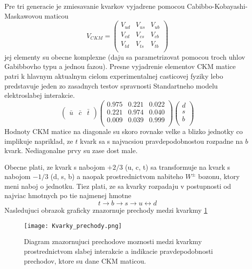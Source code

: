 \documentclass[../../main.tex]{subfiles}
\begin{document}
Pre tri generacie je zmiesavanie kvarkov vyjadrene pomocou Cabibbo-Kobayashi-Maskawovou maticou
\[ V_{CKM}=
\begin{pmatrix}
    V_{ud} & V_{us} & V_{ub} \\
    V_{cd} & V_{cs} & V_{cb} \\
    V_{td} & V_{ts} & V_{tb} \\
\end{pmatrix}
\]
jej elementy su obecne komplexne (daju sa parametrizovat pomocou troch uhlov Gabibbovho typu a jednou fazou). Presne vyjadrenie elementov CKM matice patri k hlavnym aktualnym cielom experimentalnej casticovej fyziky lebo predstavuje jeden zo zasadnych testov spravnosti Standartneho modelu elektroslabej interakcie.
\[
\begin{pmatrix}
    \bar{u} & \bar{c} & \bar{t} \\
\end{pmatrix} 
\begin{pmatrix}
    0.975 & 0.221 & 0.022 \\
    0.221 & 0.974 & 0.040 \\
    0.009 & 0.039 & 0.999 \\
\end{pmatrix}
\begin{pmatrix}
    d \\
    s \\
    b \\
\end{pmatrix}
\]
Hodnoty CKM matice na diagonale su skoro rovnake velke a blizko jednotky co implikuje napriklad, ze $t$ kvark sa s najvacsiou pravdepodobnostou rozpadne na $b$ kvark. Nediagonalne prvy su zase dost male.\par Obecne plati, ze kvark s nabojom $+2/3$ (u, c, t) sa transformuje na kvark s nabojom $-1/3$ (d, s, b) a naopak prostrednictvom nabiteho $W^{\pm}$ bozonu, ktory meni naboj o jednotku. Tiez plati, ze sa kvarky rozpadaju v postupnosti od najviac hmotnych po tie najmenej hmotne 
$$
t\rightarrow b\rightarrow s\rightarrow u \leftrightarrow d
$$
Nasledujuci obrazok graficky znazornuje prechody medzi kvarkmy \ref{sf1:fig:Kvarky_prechody}
\begin{figure}[!h]
\centering
\texttt{[image: Kvarky\_prechody.png]}
\caption{Diagram znazornujuci prechodove moznosti medzi kvarkmy prostrednictvom slabej interakcie a indikacie pravdepodobnosti prechodov, ktore su dane CKM maticou.}
\caption{}
\label{sf1:fig:Kvarky_prechody}
\end{figure}
\end{document}
